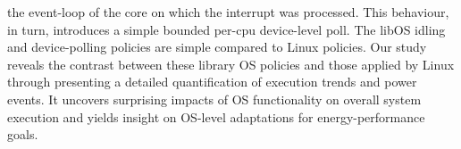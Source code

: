 the event-loop of the core on which the interrupt was processed. This behaviour, in turn, introduces a simple bounded per-cpu device-level poll. The libOS idling and device-polling policies are simple compared to Linux policies. Our study reveals the contrast between these library OS policies and those applied by Linux through presenting a detailed quantification of execution trends and power events. It uncovers surprising impacts of OS functionality on overall system execution and yields insight on OS-level adaptations for energy-performance goals.


%
%
%

